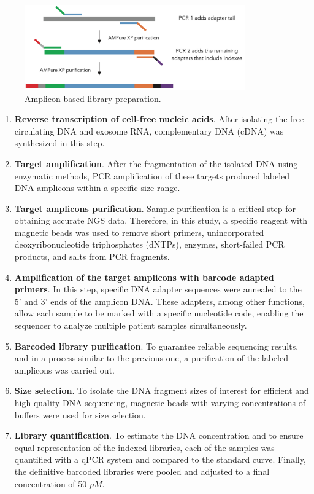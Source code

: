 \begin{figure}[ht]
    \centering
    \includegraphics[width=0.85\textwidth]{Images/chapter_3/NGS_library.png}
    \caption{Amplicon-based library preparation.}
    \label{fig:library}
\end{figure}

\begin{enumerate}[font=\bfseries]
    \item \textbf{Reverse transcription of cell-free nucleic acids}. After isolating the free-circulating DNA and exosome RNA, complementary DNA (cDNA) was synthesized in this step.
    \item \textbf{Target amplification}. After the fragmentation of the isolated DNA using enzymatic methods, PCR amplification of these targets produced labeled DNA amplicons within a specific size range.
    \item \textbf{Target amplicons purification}. Sample purification is a critical step for obtaining accurate NGS data. Therefore, in this study, a specific reagent with magnetic beads was used to remove short primers, unincorporated deoxyribonucleotide triphosphates (dNTPs), enzymes, short-failed PCR products, and salts from PCR fragments.
    \item \textbf{Amplification of the target amplicons with barcode adapted primers}. In this step, specific DNA adapter sequences were annealed to the 5' and 3' ends of the amplicon DNA. These adapters, among other functions, allow each sample to be marked with a specific nucleotide code, enabling the sequencer to analyze multiple patient samples simultaneously.
    \item \textbf{Barcoded library purification}. To guarantee reliable sequencing results, and in a process similar to the previous one, a purification of the labeled amplicons was carried out.
    \item \textbf{Size selection}. To isolate the DNA fragment sizes of interest for efficient and high-quality DNA sequencing, magnetic beads with varying concentrations of buffers were used for size selection.
    \item \textbf{Library quantification}. To estimate the DNA concentration and to ensure equal representation of the indexed libraries, each of the samples was quantified with a qPCR system and compared to the standard curve. Finally, the definitive barcoded libraries were pooled and adjusted to a final concentration of 50 $pM$.
\end{enumerate}

